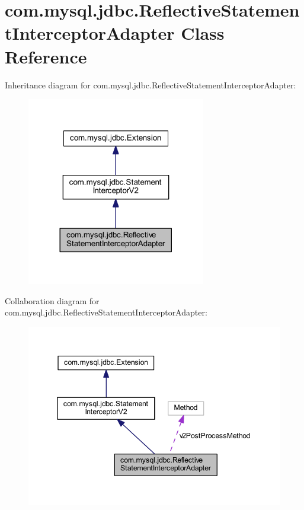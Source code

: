 \hypertarget{classcom_1_1mysql_1_1jdbc_1_1_reflective_statement_interceptor_adapter}{}\section{com.\+mysql.\+jdbc.\+Reflective\+Statement\+Interceptor\+Adapter Class Reference}
\label{classcom_1_1mysql_1_1jdbc_1_1_reflective_statement_interceptor_adapter}


Inheritance diagram for com.\+mysql.\+jdbc.\+Reflective\+Statement\+Interceptor\+Adapter\+:
\nopagebreak
\begin{figure}[H]
\begin{center}
\leavevmode
\includegraphics[width=221pt]{classcom_1_1mysql_1_1jdbc_1_1_reflective_statement_interceptor_adapter__inherit__graph}
\end{center}
\end{figure}


Collaboration diagram for com.\+mysql.\+jdbc.\+Reflective\+Statement\+Interceptor\+Adapter\+:
\nopagebreak
\begin{figure}[H]
\begin{center}
\leavevmode
\includegraphics[width=346pt]{classcom_1_1mysql_1_1jdbc_1_1_reflective_statement_interceptor_adapter__coll__graph}
\end{center}
\end{figure}
